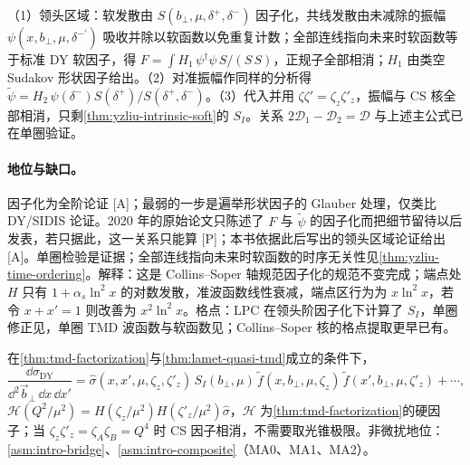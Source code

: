\begin{proofsketch}
（1）领头区域\cite[第~5~节、图~25]{Liu:2022nnk}：软发散由 $S(b_\perp,\mu,\delta^+,\delta^-)$ 因子化，共线发散由未减除的振幅 $\psi(x,b_\perp,\mu,\delta^{-\prime})$ 吸收并除以软函数以免重复计数；全部连线指向未来时软函数等于标准 DY 软因子，得 $F=\int H_1\,\psi^\dagger\psi\,S/(S\,S)$，正规子全部相消\cite[式~(145)]{Liu:2022nnk}；$H_1$ 由类空 Sudakov 形状因子给出\cite[式~(148)]{Liu:2022nnk}。（2）对准振幅作同样的分析得 $\tilde\psi=H_2\,\psi(\delta^-)S(\delta^+)/S(\delta^+,\delta^-)$\cite[式~(150)]{Liu:2022nnk}。（3）代入并用 $\zeta\zeta'=\zeta_z\zeta'_z$，振幅与 CS 核全部相消，只剩\cref{thm:yzliu-intrinsic-soft}的 $S_I$\cite[式~(151)--(152)]{Liu:2022nnk}。关系 $2\mathcal D_1-\mathcal D_2=\mathcal D$ 与上述主公式已在单圈验证\cite{Ji:2019sxk}。
\end{proofsketch}

\paragraph{地位与缺口。}因子化为全阶论证 [A]；最弱的一步是遍举形状因子的 Glauber 处理，仅类比 DY/SIDIS 论证。2020 年的原始论文\cite{Ji:2019sxk}只陈述了 $F$ 与 $\tilde\psi$ 的因子化而把细节留待以后发表，若只据此，这一关系只能算 [P]；本书依据此后写出的领头区域论证\cite[第~5~节]{Liu:2022nnk}给出 [A]。单圈检验是证据；全部连线指向未来时软函数的时序无关性见\cref{thm:yzliu-time-ordering}。解释：这是 Collins--Soper 轴规范因子化\cite{CollinsSoper1981}的规范不变完成；端点处 $H$ 只有 $1+\alpha_s\ln^2x$ 的对数发散，准波函数线性衰减，端点区行为为 $x\ln^2x$，若令 $x+x'=1$ 则改善为 $x^2\ln^2x$。格点：LPC 在领头阶因子化下计算了 $S_I$\cite{LatticeParton:2020uhz}，单圈修正见\cite{LatticePartonLPC:2023pdv}，单圈 TMD 波函数与软函数见\cite{Deng:2022gzi}；Collins--Soper 核的格点提取更早已有\cite{Shanahan:2020zxr}。

\begin{proposition}\label{prop:yzliu-dy-quasi}
在\cref{thm:tmd-factorization}与\cref{thm:lamet-quasi-tmd}成立的条件下，
\begin{equation}\label{eq:yzliu-dy-quasi}
\frac{\dd\sigma_{\mathrm{DY}}}{\dd^2\vec b_\perp\,\dd x\,\dd x'}=\hat\sigma(x,x',\mu,\zeta_z,\zeta'_z)\,S_I(b_\perp,\mu)\,\tilde f(x,b_\perp,\mu,\zeta_z)\,\tilde f(x',b_\perp,\mu,\zeta'_z)+\cdots,
\end{equation}
$\mathcal H(Q^2/\mu^2)=H(\zeta_z/\mu^2)H(\zeta'_z/\mu^2)\hat\sigma$，$\mathcal H$ 为\cref{thm:tmd-factorization}的硬因子；当 $\zeta_z\zeta'_z=\zeta_A\zeta_B=Q^4$ 时 CS 因子相消，不需要取光锥极限。非微扰地位：\cref{asm:intro-bridge}、\cref{asm:intro-composite}（MA0、MA1、MA2）。
\end{proposition}

